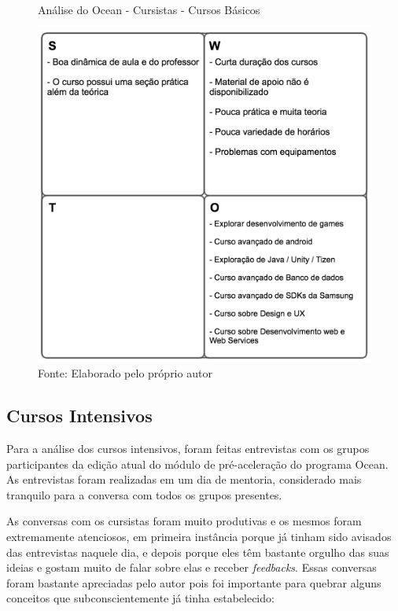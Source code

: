 \begin{figure}[h]
\caption{Análise do Ocean - Cursistas - Cursos Básicos}
\centerline{\includegraphics[scale=0.75]{img/cursosbasicosswot}}
\label{fig:swotcursosbasicos}
\caption* {Fonte: Elaborado pelo próprio autor}
\end{figure}

\subsection{Cursos Intensivos}

Para a análise dos cursos intensivos, foram feitas entrevistas com os grupos participantes da edição atual do módulo de pré-aceleração do programa Ocean. As entrevistas foram realizadas em um dia de mentoria, considerado mais tranquilo para a conversa com todos os grupos presentes.

As conversas com os cursistas foram muito produtivas e os mesmos foram extremamente atenciosos, em primeira instância porque já tinham sido avisados das entrevistas naquele dia, e depois porque eles têm bastante orgulho das suas ideias e gostam muito de falar sobre elas e receber \textit{feedbacks}. Essas conversas foram bastante apreciadas pelo autor pois foi importante para quebrar alguns conceitos que subconscientemente já tinha estabelecido:

